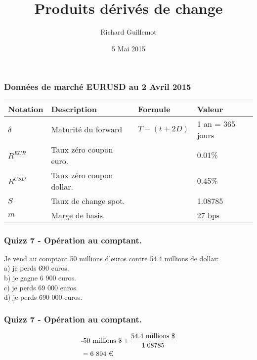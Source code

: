 \documentclass{beamer}
\title[Produits dérivés actions,change et credit]{Produits dérivés de change}
\author{Richard Guillemot}
\institute{DIFIQ}
\date{5 Mai 2015}
\begin{document}
\begin{frame}
\titlepage
\end{frame}

\begin{frame}
\small
\frametitle{Données de marché EURUSD au 2 Avril 2015}
\begin{center}
\begin{tabular}{|l|l|l|l|}
\hline
\textbf{Notation} & \textbf{Description} & \textbf{Formule} & \textbf{Valeur} \\
\hline
\hline
$\delta$ & Maturité du forward & $T-(t+2D)$ & 1 an = 365 jours \\
$R^{EUR}$ & Taux zéro coupon euro. &  & 0.01\% \\
$R^{USD}$ & Taux zéro coupon dollar. &  & 0.45\% \\
$S$ & Taux de change spot. &  & 1.08785 \\
$m$ & Marge de basis. &  & 27 bps \\
\hline
\end{tabular}
\end{center}
\end{frame}

\begin{frame}
\frametitle{Quizz 7 - Opération au comptant.}
Je vend au comptant 50 millions d'euros contre 54.4 millions de dollar: \\
\vspace{0.5cm}
a) je perds 690 euros. \\
b) je gagne 6 900 euros.  \\
c) je perds 69 000 euros. \\
d) je perds 690 000 euros.  \\
\vspace{0.5cm}
\end{frame}

\begin{frame}
\frametitle{Quizz 7 - Opération au comptant.}
\huge
\[
\begin{split}
&\text{-50 millions \$}+\frac{\text{54.4 millions \$}}{1.08785}\\
&=\text{6 894 \texteuro}\\
\end{split}
\]
\end{frame}
\end{document}
